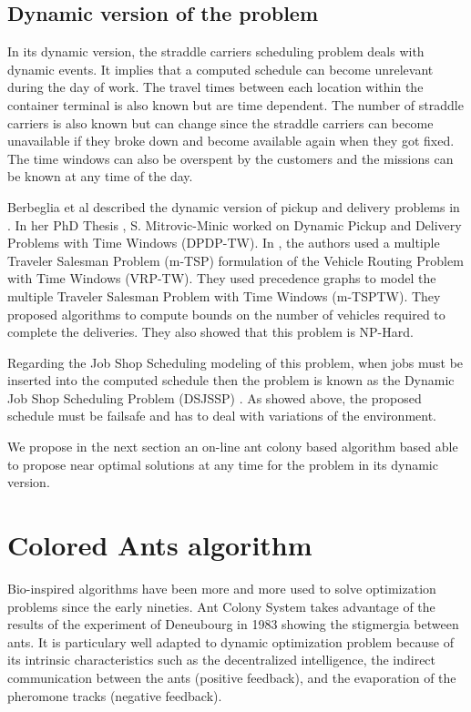 \documentclass[a4paper,10pt]{article}
\begin{document}
    \subsection{Dynamic version of the problem}

In its dynamic version, the straddle carriers scheduling problem deals with dynamic events. It implies that a computed schedule can become unrelevant during the day of work. The travel times between each location within the container terminal is also known but are time dependent. The number of straddle carriers is also known but can change since the straddle carriers can become unavailable if they broke down and become available again when they got fixed. The time windows can also be overspent by the customers and the missions can be known at any time of the day.

Berbeglia et al described the dynamic version of pickup and delivery problems in \cite{Berbeglia2010}. In her PhD Thesis \cite{Mitrovic2001}, S. Mitrovic-Minic worked on Dynamic Pickup and Delivery Problems with Time Windows (DPDP-TW). In \cite{Mitrovic2006}, the authors used a multiple Traveler Salesman Problem (m-TSP) formulation of the Vehicle Routing Problem with Time Windows (VRP-TW). They used precedence graphs to model the multiple Traveler Salesman Problem with Time Windows (m-TSPTW). They proposed algorithms to compute bounds on the number of vehicles required to complete the deliveries. They also showed that this problem is NP-Hard.

Regarding the Job Shop Scheduling modeling of this problem, when jobs must be inserted into the computed schedule then the problem is known as the Dynamic Job Shop Scheduling Problem (DSJSSP) \cite{Ramasesh1990}. %
As showed above, the proposed schedule must be failsafe and has to deal with variations of the environment. 

We propose in the next section an on-line ant colony based algorithm based able to propose near optimal solutions at any time for the problem in its dynamic version.

\section{Colored Ants algorithm}
Bio-inspired algorithms have been more and more used to solve optimization problems since the early nineties\cite{Dorigo2006}. Ant Colony System takes advantage of the results of the experiment of Deneubourg in 1983 \cite{Deneubourg1983} showing the stigmergia between ants. It is particulary well adapted to dynamic optimization problem because of its intrinsic characteristics such as the decentralized intelligence, the indirect communication between the ants (positive feedback), and the evaporation of the pheromone tracks (negative feedback).
\end{document}
